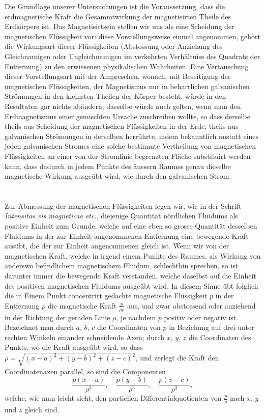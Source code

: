 \documentclass[fontsize=11pt,paper=a4,twoside,openany]{scrbook}
\begin{document}
Die Grundlage unserer Untersuchungen ist die Voraussetzung, dass die erdmagnetische Kraft die Gesammtwirkung der magnetisirten Theile des Erdkörpers ist. Das Magnetisirtsein stellen wir uns als eine Scheidung der magnetischen Flüssigkeit vor: diese Vorstellungsweise einmal angenommen, gehört die Wirkungsart dieser Flüssigkeiten (Abstossung oder Anziehung des Gleichnamigen oder Ungleichnamigen im verkehrten Verhältniss des Quadrats der Entfernung) zu den erwiesenen physikalischen Wahrheiten. Eine Vertauschung dieser Vorstellungsart mit der Ampreschen, wonach, mit Beseitigung der magnetischen Flüssigkeiten, der Magnetismus nur in beharrlichen galvanischen Strömungen in den kleinsten Theilen der Körper besteht, würde in den Resultaten gar nichts abändern; dasselbe würde auch gelten, wenn man den Erdmagnetismus einer gemischten Ursache zuschreiben wollte, so dass derselbe theils aus Scheidung der magnetischen Flüssigkeiten in der Erde, theils aus galvanischen Strömungen in derselben herrührte, indem bekanntlich anstatt eines jeden galvanischen Stromes eine solche bestimmte Vertheilung von magnetischen Flüssigkeiten an einer von der Stromlinie begrenzten Fläche substituirt werden kann, dass dadurch in jedem Punkte des äussern Raumes genau dieselbe magnetische Wirkung ausgeübt wird, wie durch den galvanischen Strom.

\section{}

Zur Abmessung der magnetischen Flüssigkeiten legen wir, wie in der Schrift \textit{Intensitas vis magneticae etc.}, diejenige Quantität nördlichen Fluidums als positive Einheit zum Grunde, welche auf eine eben so grosse Quantität desselben Fluidums in der zur Einheit angenommenen Entfernung eine bewegende Kraft ausübt, die der zur Einheit angenommenen gleich ist. Wenn wir von der magnetischen Kraft, welche in irgend einem Punkte des Raumes, als Wirkung von anderswo befindlichem magnetischem Fluidum, schlechthin sprechen, so ist darunter immer die bewegende Kraft verstanden, welche daselbst auf die Einheit des positiven magnetischen Fluidums ausgeübt wird. In diesem Sinne übt folglich die in Einem Punkt concentrirt gedachte magnetische Flüssigkeit $p$ in der Entfernung $\rho$ die magnetische Kraft $\frac{p}{\rho\rho}$ aus, und zwar abstossend oder anziehend in der Richtung der geraden Linie $\rho$, je nachdem $p$ positiv oder negativ ist. Bezeichnet man durch $a$, $b$, $c$ die Coordinaten von $p$ in Beziehung auf drei unter rechten Winkeln einander schneidende Axen; durch $x$, $y$, $z$ die Coordinaten des Punkts, wo die Kraft ausgeübt wird, so dass $\rho=\sqrt{(x-a)^2+(y-b)^2+(z-c)^2}$, und zerlegt die Kraft den Coordinatenaxen parallel, so sind die Componenten
\[
\frac{p(x-a)}{\rho^3},\quad \frac{p(y-b)}{\rho^3},\quad \frac{p(z-c)}{\rho^3},
\]
welche, wie man leicht sieht, den partiellen Differentialquotienten von $\frac{p}{\rho}$ nach $x$, $y$ und $z$ gleich sind.
\end{document}
